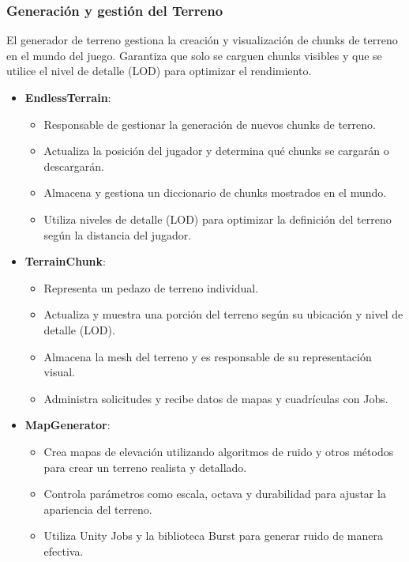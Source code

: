 \subsubsection{Generación y gestión del Terreno}
El generador de terreno gestiona la creación y visualización de chunks de terreno en el mundo del juego. Garantiza que solo se carguen chunks visibles y que se utilice el nivel de detalle (LOD) para optimizar el rendimiento.

\begin{itemize}
    \item \textbf{EndlessTerrain}:
    \begin{itemize}
    \item Responsable de gestionar la generación de nuevos chunks de terreno.
    \item Actualiza la posición del jugador y determina qué chunks se cargarán o descargarán. 
	\item Almacena y gestiona un diccionario de chunks mostrados en el mundo.	
	\item Utiliza niveles de detalle (LOD) para optimizar la definición del terreno según la distancia del jugador.
	
    \end{itemize}

    \item \textbf{TerrainChunk}:  
    \begin{itemize}
        \item Representa un pedazo de terreno individual.
       \item Actualiza y muestra una porción del terreno según su ubicación y nivel de detalle (LOD).  
	    \item Almacena la mesh del terreno y es responsable de su representación visual.
	    \item Administra solicitudes y recibe datos de mapas y cuadrículas con Jobs.
    \end{itemize}

    \item \textbf{MapGenerator}: 
    \begin{itemize}
        \item Crea mapas de elevación utilizando algoritmos de ruido y otros métodos para crear un terreno realista y detallado.
	    \item Controla parámetros como escala, octava y durabilidad para ajustar la apariencia del terreno.  
	    \item Utiliza Unity Jobs y la biblioteca Burst para generar ruido de manera efectiva.
    \end{itemize}


\end{itemize}
